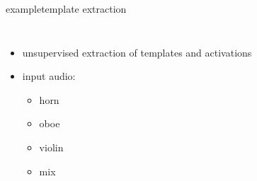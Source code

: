         \begin{frame}{example}{template extraction}
            \vspace{-3mm}
            \begin{columns}
                    \begin{itemize}
                        \item   unsupervised extraction of templates and activations
                        \item   input audio: 
                            \begin{itemize}
                                \item  {} horn
                                \item  {} oboe
                                \item  {} violin
                                \item  {} mix
                            \end{itemize}
                    \end{itemize}
            \end{columns}
        \end{frame}
        
